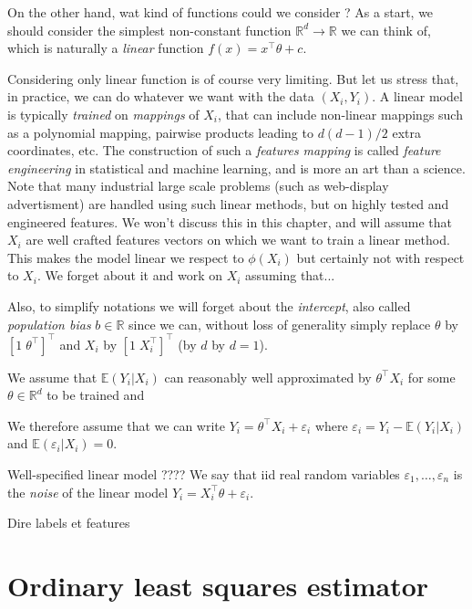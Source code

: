 \documentclass[
	fontsize=11pt, %
	twoside=false, %
	numbers=noenddot, %
]{kaobook}
\newcommand{\eps}{\varepsilon}
\newcommand{\E}{\mathbb E}
\newcommand{\R}{\mathbb R}
\newcommand{\go}{\rightarrow}
\begin{document}
On the other hand, wat kind of functions could we consider ?
As a start, we should consider the simplest non-constant function $\R^d \go \R$ we can think of, which is naturally a \emph{linear} function $f(x) = x^\top \theta + c$.

\begin{kaobox}[frametitle=Features engineering]
	Considering only linear function is of course very limiting. But let us stress that, in practice, we can do whatever we want with the data $(X_i, Y_i)$. A linear model is typically \emph{trained} on \emph{mappings} of $X_i$, that can include non-linear mappings such as a polynomial mapping, pairwise products leading to $d(d-1)/2$ extra coordinates, etc. The construction of such a \emph{features mapping} is called \emph{feature engineering} in statistical and machine learning, and is more an art than a science. Note that many industrial large scale problems (such as web-display advertisment) are handled using such linear methods, but on highly tested and engineered features. We won't discuss this in this chapter, and will assume that $X_i$ are well crafted features vectors on which we want to train a linear method.	
	This makes the model linear we respect to $\phi(X_i)$ but certainly not with respect to $X_i$.
	We forget about it and work on $X_i$ assuming that...
\end{kaobox}

Also, to simplify notations we will forget about the \emph{intercept}, also called \emph{population bias} $b \in \R$ since we can, without loss of generality simply replace $\theta$ by $[1 \; \theta^\top]^\top$ and $X_i$ by $[1 \; X_i^\top]^\top$ (by $d$ by $d=1$).

We assume that $\E(Y_i | X_i)$ can reasonably well approximated by $\theta^\top X_i$ for some $\theta \in \R^d$ to be trained and 

We therefore assume that we can write $Y_i = \theta^\top X_i + \eps_i$ where $\eps_i = Y_i - \E(Y_i | X_i)$ and $\E(\eps_i | X_i) = 0$.


Well-specified linear model ????
We say that iid real random variables $\eps_1, \ldots, \eps_n$ is the \emph{noise} of the linear model $Y_i = X_i^\top \theta + \eps_i$.

Dire labels et features

\section{Ordinary least squares estimator} %
\label{sec:least_squares_estimator}
\end{document}
